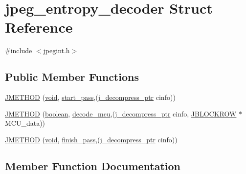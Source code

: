 \hypertarget{structjpeg__entropy__decoder}{}\section{jpeg\+\_\+entropy\+\_\+decoder Struct Reference}
\label{structjpeg__entropy__decoder}


{\ttfamily \#include $<$jpegint.\+h$>$}

\subsection*{Public Member Functions}
\begin{DoxyCompactItemize}
\item 
\hyperlink{structjpeg__entropy__decoder_ab1b90e7d9348599cecc7b6c86d291ae4}{J\+M\+E\+T\+H\+O\+D} (\hyperlink{png_8h_aa8c59027f9ab2769342f248709d68d17}{void}, \hyperlink{jddctmgr_8c_a1964f006adb8fb80f57e455f6452aec1}{start\+\_\+pass},(\hyperlink{jpeglib_8h_a00c7d78af44bd26a901c791ccfc1e178}{j\+\_\+decompress\+\_\+ptr} cinfo))
\item 
\hyperlink{structjpeg__entropy__decoder_a151f6f7497ba68935cca4b28ee75a596}{J\+M\+E\+T\+H\+O\+D} (\hyperlink{jmorecfg_8h_a7c6368b321bd9acd0149b030bb8275ed}{boolean}, \hyperlink{jdhuff_8c_a35432ad418198722f261a1f66b745595}{decode\+\_\+mcu},(\hyperlink{jpeglib_8h_a00c7d78af44bd26a901c791ccfc1e178}{j\+\_\+decompress\+\_\+ptr} cinfo, \hyperlink{jpeglib_8h_a04dea0959d9bd9e8ddad83597161453b}{J\+B\+L\+O\+C\+K\+R\+O\+W} $\ast$M\+C\+U\+\_\+data))
\item 
\hyperlink{structjpeg__entropy__decoder_af016a41a26657b3f056b2edbc0d24014}{J\+M\+E\+T\+H\+O\+D} (\hyperlink{png_8h_aa8c59027f9ab2769342f248709d68d17}{void}, \hyperlink{jdarith_8c_a51cf466731c95bff0e472f382544d8c6}{finish\+\_\+pass},(\hyperlink{jpeglib_8h_a00c7d78af44bd26a901c791ccfc1e178}{j\+\_\+decompress\+\_\+ptr} cinfo))
\end{DoxyCompactItemize}


\subsection{Member Function Documentation}
\hypertarget{structjpeg__entropy__decoder_ab1b90e7d9348599cecc7b6c86d291ae4}{}

